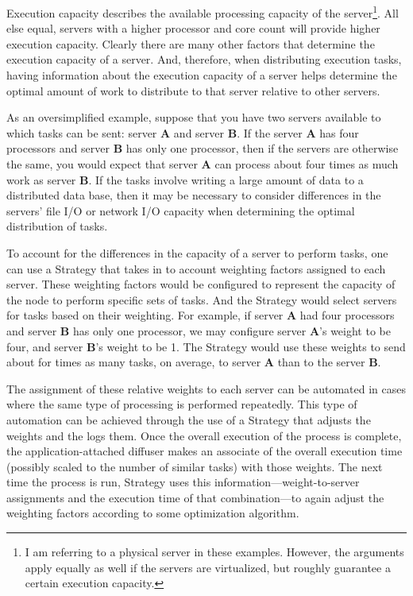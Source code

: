 \documentclass[11pt]{scrartcl}
\begin{document}
Execution capacity describes the available processing capacity of the server\footnote{I am referring to a physical server in these examples. However, the arguments apply equally as well if the servers are virtualized, but roughly guarantee a certain execution capacity.}. All else equal, servers with a higher processor and core count will provide higher execution capacity. Clearly there are many other factors that determine the execution capacity of a server. And, therefore, when distributing execution tasks, having information about the execution capacity of a server helps determine the optimal amount of work to distribute to that server relative to other servers. 

As an oversimplified example, suppose that you have two servers available to which tasks can be sent: server \textbf{A} and server \textbf{B}. If the server \textbf{A} has four processors and server \textbf{B} has only one processor, then if the servers are otherwise the same, you would expect  that server \textbf{A} can process about four times as much work as server \textbf{B}. If the tasks involve writing a large amount of data to a distributed data base, then it may be necessary to consider differences in the servers' file I/O or network I/O capacity when determining the optimal distribution of tasks.

To account for the differences in the capacity of a server to perform tasks, one can use a \textsf{Strategy} that takes in to account weighting factors assigned to each server. These weighting factors would be configured to represent the capacity of the node to perform specific sets of tasks. And the \textsf{Strategy} would select servers for tasks based on their weighting. For example, if server \textbf{A} had four processors and server \textbf{B} has only one processor, we may configure server \textbf{A}'s weight to be four, and server \textbf{B}'s weight to be 1. The \textsf{Strategy} would use these weights to send about for times as many tasks, on average, to server \textbf{A} than to the server \textbf{B}.

The assignment of these relative weights to each server can be automated in cases where the same type of processing is performed repeatedly. This type of automation can be achieved through the use of a \textsf{Strategy} that adjusts the weights and the logs them. Once the overall execution of the process is complete, the application-attached diffuser makes an associate of the overall execution time (possibly scaled to the number of similar tasks) with those weights. The next time the process is run, \textsf{Strategy} uses this information---weight-to-server assignments and the execution time of that combination---to again adjust the weighting factors according to some optimization algorithm.
\end{document}
